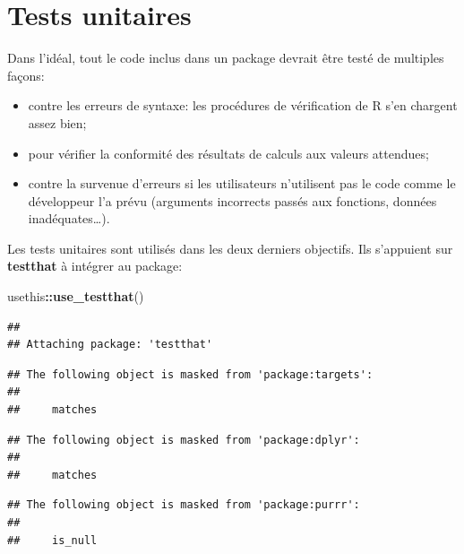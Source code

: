 \documentclass[
  12pt,
  french,
  a4paper,
  extrafontsizes,onecolumn,openright
  ]{memoir}
\newenvironment{Shaded}{\begin{snugshade}}{\end{snugshade}}
\newcommand{\KeywordTok}[1]{\textcolor[rgb]{0.13,0.29,0.53}{\textbf{#1}}}
\newcommand{\NormalTok}[1]{#1}
\newcommand{\OperatorTok}[1]{\textcolor[rgb]{0.81,0.36,0.00}{\textbf{#1}}}
\providecommand{\tightlist}{%
  \setlength{\itemsep}{0pt}\setlength{\parskip}{0pt}}
\begin{document}
\hypertarget{tests-unitaires}{%
\section{Tests unitaires}\label{tests-unitaires}}

Dans l'idéal, tout le code inclus dans un package devrait être testé de multiples façons:

\begin{itemize}
\tightlist
\item
  contre les erreurs de syntaxe: les procédures de vérification de R s'en chargent assez bien;
\item
  pour vérifier la conformité des résultats de calculs aux valeurs attendues;
\item
  contre la survenue d'erreurs si les utilisateurs n'utilisent pas le code comme le développeur l'a prévu (arguments incorrects passés aux fonctions, données inadéquates\ldots).
\end{itemize}

Les tests unitaires sont utilisés dans les deux derniers objectifs.
Ils s'appuient sur \textbf{testthat} à intégrer au package:

\scriptsize

\begin{Shaded}
\begin{Highlighting}[]
\NormalTok{usethis}\OperatorTok{::}\KeywordTok{use_testthat}\NormalTok{()}
\end{Highlighting}
\end{Shaded}

\normalsize

\scriptsize

\begin{verbatim}
## 
## Attaching package: 'testthat'
\end{verbatim}

\begin{verbatim}
## The following object is masked from 'package:targets':
## 
##     matches
\end{verbatim}

\begin{verbatim}
## The following object is masked from 'package:dplyr':
## 
##     matches
\end{verbatim}

\begin{verbatim}
## The following object is masked from 'package:purrr':
## 
##     is_null
\end{verbatim}
\end{document}
